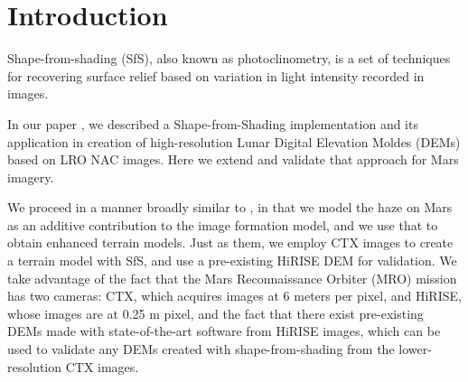 \documentclass[draft,linenumbers]{agujournal}
\begin{document}
%
%
%
%

\section{Introduction}

Shape-from-shading (SfS), also known as photoclinometry, is a set of
techniques for recovering surface relief based on variation in light
intensity recorded in images. 

In our paper \cite{alexandrovmulti}, we described a Shape-from-Shading implementation
and its application in creation of high-resolution Lunar Digital Elevation Moldes (DEMs) based on LRO NAC
images. Here we extend and validate that approach for Mars imagery. 

We proceed in a manner broadly similar to \citep{wohlfarth2018high}, in that we model the haze on Mars as an additive contribution to the image formation model, and we use that to obtain enhanced terrain models. Just as them, we employ CTX images to create a terrain model with SfS, and use a pre-existing HiRISE DEM for validation. We take advantage of the fact that the Mars Reconnaissance Orbiter (MRO) mission has two cameras: CTX, which acquires images at 6 meters per pixel, and HiRISE, whose images are at 0.25 m pixel, and the fact that there exist pre-existing DEMs made with state-of-the-art software from HiRISE images, which can be used to validate any DEMs created with shape-from-shading from the lower-resolution CTX images.   
\end{document}
